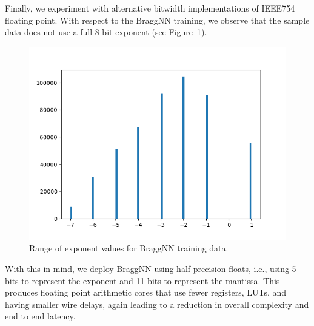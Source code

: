 Finally, we experiment with alternative bitwidth implementations of IEEE754 floating point.
With respect to the BraggNN training, we observe that the sample data does not use a full 8 bit exponent (see Figure~\ref{fig:numexp}).
\begin{figure}
	\includegraphics[width=\columnwidth]{figures/exp_bits}
	\caption{Range of exponent values for BraggNN training data.}\label{fig:numexp}
\end{figure}
With this in mind, we deploy BraggNN using half precision floats, i.e., using 5 bits to represent the exponent and 11 bits to represent the mantissa.
This produces floating point arithmetic cores that use fewer registers, LUTs, and having smaller wire delays, again leading to a reduction in overall complexity and end to end latency.
